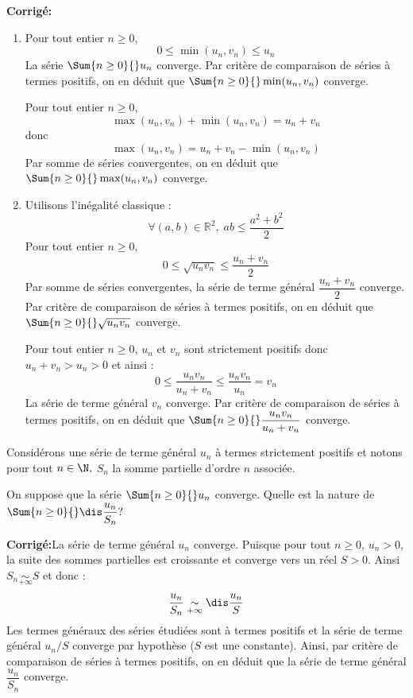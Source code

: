 \documentclass[a4paper,twoside,french,10pt]{VcCours}
\newcommand{\corr}{\textbf{Corrigé:}}
\begin{document}
\newpage

\corr  

\begin{enumerate}
\item Pour tout entier $n \geq 0$,
$$ 0 \leq  \min(u_n,v_n) \leq u_n $$
La série $\Sum{n \geq 0}{} u_n$ converge. Par critère de comparaison de séries à termes positifs, on en déduit que $\Sum{n \geq 0}{} \min(u_n,v_n)$ converge. 

\medskip

\noindent Pour tout entier $n \geq 0$,
$$  \max(u_n,v_n) + \min(u_n,v_n) = u_n + v_n $$
donc 
$$ \max(u_n,v_n) =   u_n + v_n - \min(u_n,v_n)$$
Par somme de séries convergentes, on en déduit que $\Sum{n \geq 0}{} \max(u_n,v_n)$ converge.
\item Utilisons l'inégalité classique :
$$ \forall (a,b) \in \mathbb{R}^2, \; ab \leq \dfrac{a^2+b^2}{2}$$
Pour tout entier $n \geq 0$,
$$ 0 \leq \sqrt{u_n v_n} \leq \dfrac{u_n+ v_n}{2}$$
Par somme de séries convergentes, la série de terme général $\dfrac{u_n+ v_n}{2}$ converge. Par critère de comparaison de séries à termes positifs, on en déduit que $\Sum{n \geq 0}{} \sqrt{u_n v_n}$ converge. 

\medskip

\noindent Pour tout entier $n \geq 0$, $u_n$ et $v_n$ sont strictement positifs donc $u_n+v_n > u_n >0$ et ainsi :
$$ 0 \leq \dfrac{u_n v_n}{u_n+v_n} \leq \dfrac{u_n v_n}{u_n} = v_n$$
La série de terme général $v_n$ converge. Par critère de comparaison de séries à termes positifs, on en déduit que $\Sum{n \geq 0}{} \dfrac{u_n v_n}{u_n+v_n}$ converge. 
\end{enumerate}

\medskip

\begin{Exercice}{} Considérons une série de terme général $u_n$ à termes strictement positifs et notons pour tout $n\in\N,$ $S_n$ la somme partielle d'ordre $n$ associée. 

On suppose que la s\'erie $\Sum{n \geq 0}{} u_n$ converge. Quelle est la nature de $\Sum{n \geq 0}{} \dis \dfrac{u_n}{S_n}?$
\end{Exercice}

\corr La s\'erie de terme général $u_n$ converge. Puisque pour tout $n \geq 0$, $u_n>0$, la suite des sommes partielles est croissante et converge vers un réel $S>0.$ Ainsi $S_n \underset{+ \infty}{\sim} S$ et donc :
$$\frac{u_n}{S_n}\underset{+ \infty}{\sim} \dis\frac{u_n}{S}$$
Les termes généraux des séries étudiées sont à termes positifs et la s\'erie de terme général $u_n/S$ converge par hypothèse ($S$ est une constante). Ainsi, par critère de comparaison de séries à termes positifs, on en déduit que la s\'erie de terme général $\dfrac{u_n}{S_n}$ converge.
\end{document}
